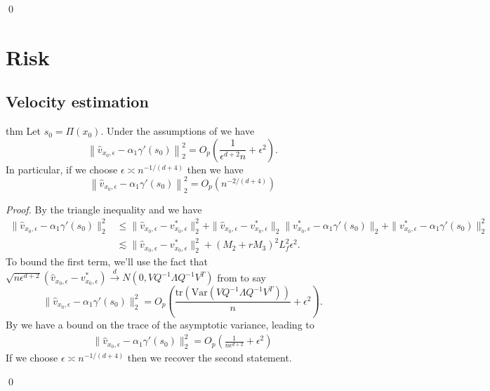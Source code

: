\documentclass[11pt]{article}
\begin{document}
\qed{}

\section{Risk}
\subsection{Velocity estimation}
\begin{restatable}{thm}{} \label{thm: velocity risk}
    Let $s_0 = \Pi(x_0)$. Under the assumptions of  we have
    \[\left\|\hat{v}_{x_0, \epsilon} - \alpha_1\gamma'(s_0)\right\|_{2}^2  =  O_p\left(\frac{1}{\epsilon^{d+2}n} + \epsilon^2\right). \]
    In particular, if we choose $\epsilon \asymp n^{-1/(d+4)}$ then we have
    \[\left\|\hat{v}_{x_0, \epsilon} - \alpha_1\gamma'(s_0)\right\|_{2}^2  =  O_p\left(n^{-2/(d+4)}\right) \]
\end{restatable}
\noindent \textit{Proof.} By the triangle inequality and  we have
\begin{align}
    \|\hat{v}_{x_0, \epsilon} - \alpha_1\gamma'(s_0)\|_{2}^2 &\leq \|\hat{v}_{x_0, \epsilon} - v^*_{x_0, \epsilon}\|_{2}^2 + \|\hat{v}_{x_0, \epsilon} - v^*_{x_0, \epsilon}\|_{2}\|v^*_{x_0, \epsilon}  - \alpha_1\gamma'(s_0)\|_{2} + \|v^*_{x_0, \epsilon}  - \alpha_1\gamma'(s_0)\|_{2}^2 \\
    &\lesssim  \|\hat{v}_{x_0, \epsilon} - v^*_{x_0, \epsilon} \|_{2}^2+  (M_2 + rM_3)^2L_f^2\epsilon^2.
\end{align}
To bound the first term, we'll use the fact that $\sqrt{n\epsilon^{d+2}}(\hat{v}_{x_0, \epsilon} - v^*_{x_0, \epsilon}) \overset{d}{\rightarrow}N(0, VQ^{-1}\Lambda Q^{-1}V^T)$ from  to say
\begin{equation}
    \|\hat{v}_{x_0, \epsilon} - \alpha_1\gamma'(s_0)\|_{2}^2 = O_p\left(\frac{\text{tr}(\text{Var}(VQ^{-1}\Lambda Q^{-1}V^T))}{n} + \epsilon^2\right).
\end{equation}
By  we have a bound on the trace of the asymptotic variance, leading to
\begin{align}
    \|\hat{v}_{x_0, \epsilon} - \alpha_1\gamma'(s_0)\|_{2}^2 = O_p\left(\frac{1}{n\epsilon^{d+2}} + \epsilon^2\right)
\end{align}
If we choose $\epsilon \asymp n^{-1/(d+4)}$ then we recover the second statement.

\qed{}
\end{document}

